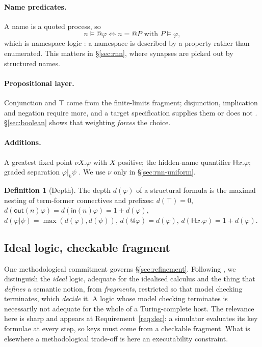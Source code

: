 \documentclass[11pt,a4paper]{article}
\theoremstyle{plain}
\theoremstyle{definition}
\newtheorem{definition}[theorem]{Definition}
\theoremstyle{remark}
\newcommand{\sepc}{\mathbin{\big|}}
\newcommand{\Hq}{\mathsf{H}}
\newcommand{\out}{\mathsf{out}}
\newcommand{\inn}{\mathsf{in}}
\newcommand{\dpt}{d}
\begin{document}
\paragraph{Name predicates.} A name is a quoted process, so
\[
n \models @\varphi \iff n = @P \text{ with } P \models \varphi ,
\]
which is namespace logic \cite{namespace}: a namespace is described by a property rather than
enumerated. This matters in \S\ref{sec:rnn}, where synapses are picked out by structured names.

\paragraph{Propositional layer.} Conjunction and $\top$ come from the finite-limits fragment;
disjunction, implication and negation require more, and a target specification supplies them or does
not \cite{omnibus}. \S\ref{sec:boolean} shows that weighting \emph{forces} the choice.

\paragraph{Additions.} A greatest fixed point $\nu X.\varphi$ with $X$ positive; the hidden-name
quantifier $\Hq x.\varphi$; graded separation $\varphi \sepc_k \psi$ \cite[\S2.3]{classifier}. We
use $\nu$ only in \S\ref{sec:rnn-uniform}.

\begin{definition}[Depth]
\label{def:depth}
The depth $\dpt(\varphi)$ of a structural formula is the maximal nesting of term-former connectives
and prefixes: $\dpt(\top) = 0$, $\dpt(\out(n)\varphi) = \dpt(\inn(n)\varphi) = 1 + \dpt(\varphi)$,
$\dpt(\varphi \sepc \psi) = \max(\dpt(\varphi), \dpt(\psi))$, $\dpt(@\varphi) = \dpt(\varphi)$,
$\dpt(\Hq x.\varphi) = 1 + \dpt(\varphi)$.
\end{definition}

\subsection{Ideal logic, checkable fragment}

One methodological commitment governs \S\ref{sec:refinement}. Following \cite[\S1.3]{classifier}, we
distinguish the \emph{ideal} logic, adequate for the idealised calculus and the thing that
\emph{defines} a semantic notion, from \emph{fragments}, restricted so that model checking
terminates, which \emph{decide} it. A logic whose model checking terminates is necessarily not
adequate for the whole of a Turing-complete host. The relevance here is sharp and appears at
Requirement~\ref{req:dec}: a simulator evaluates its key formulae at every step, so keys must come
from a checkable fragment. What is elsewhere a methodological trade-off is here an executability
constraint.
\end{document}
